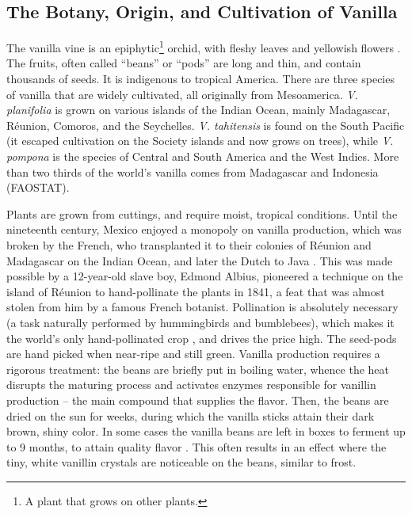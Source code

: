 \subsection{The Botany, Origin, and Cultivation of Vanilla }

The vanilla vine is an epiphytic\footnote{A plant that grows on other plants.} orchid,  with fleshy leaves and yellowish flowers \autocite[282]{van_wyk_culinary_2014}. 
The fruits, often called ``beans'' or ``pods'' are long and thin, and contain thousands of seeds. It is indigenous to tropical America. There are three species of vanilla that are widely cultivated, all  originally from Mesoamerica. \textit{V. planifolia} is grown on various islands of the Indian Ocean, mainly Madagascar, Réunion, Comoros, and the Seychelles. \textit{V. tahitensis} is found on the South Pacific (it escaped cultivation on the Society islands and now grows on trees), while \textit{V. pompona} is the species of Central and South America and the West Indies. More than two thirds of the world's vanilla comes from Madagascar and Indonesia (FAOSTAT).

Plants are grown from cuttings, and require moist, tropical conditions. Until the nineteenth century, Mexico enjoyed a monopoly on vanilla production, which was broken by the French, who transplanted it to their colonies of Réunion and Madagascar on the Indian Ocean, and later the Dutch to Java \autocite[282]{van_wyk_culinary_2014}.
This was made possible by a 12-year-old slave boy, Edmond Albius, pioneered a technique on the island of Réunion to hand-pollinate the plants in 1841, a feat that was almost stolen from him by a famous French botanist. Pollination is absolutely necessary (a task naturally performed by hummingbirds and bumblebees), which makes it the world's only hand-pollinated crop \autocite[959]{mabberley_mabberleys_2017}, and drives the price high. The seed-pods are hand picked when near-ripe and still green. Vanilla production requires a rigorous treatment: the beans are briefly put in boiling water, whence the heat disrupts the maturing process and activates enzymes responsible for vanillin production -- the main compound that supplies the flavor. Then, the beans are dried on the sun for weeks, during which the vanilla sticks attain their dark brown, shiny color. In some cases the vanilla beans are left in boxes to ferment up to 9 months, to attain quality flavor \autocite[282]{van_wyk_culinary_2014}. This often results in an effect where the tiny, white vanillin crystals are noticeable on the beans, similar to frost.



